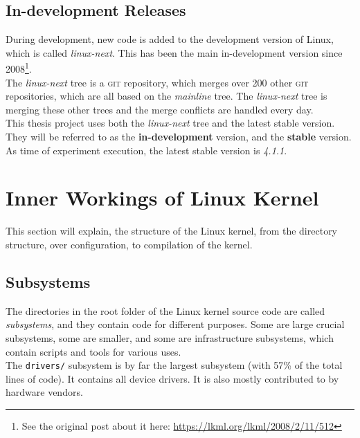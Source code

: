 \documentclass[a4paper,11pt]{report}
\newcommand{\f}{\footnote{\fn}}
\newcommand{\figa}{
    \begin{figure}[!htpb]
    \centering
}
\newcommand{\figb}[2]{
    \caption{#1}
    \label{#2}
    \end{figure}
}
\begin{document}
            \subsection*{In-development Releases}

            \def \fn {See the original post about it here: 
            \url{https://lkml.org/lkml/2008/2/11/512}}

During development, new code is added to the development version of Linux, 
which is called \emph{linux-next}. This has been the main in-development version
since 2008\f.
\\

The \emph{linux-next} tree is a \textsc{git} repository, which 
merges over 200 other \textsc{git} repositories\cite
    {nextTrees},
which are all based on the \emph{mainline} tree. The \emph{linux-next} tree is 
merging these other trees and the merge conflicts are handled every day.
\\

This thesis project uses both the \emph{linux-next} tree and the latest stable 
version. They will be referred to as the \textbf{in-development} 
version, and the \textbf{stable} version. As time of experiment execution, the 
latest stable version is \emph{4.1.1}.


    \section{Inner Workings of Linux Kernel}

This section will explain, the structure of the Linux kernel, from the 
directory structure, over configuration, to compilation of the kernel.


            \subsection{Subsystems}
            \label{sec:linuxss}

The directories in the root folder of the Linux kernel source code are called 
\emph{subsystems}, and they contain code for different purposes. Some are large 
crucial subsystems, some are smaller, and some are infrastructure 
subsystems, which contain scripts and tools for various uses\cite{42bugs}.
\\

The \texttt{drivers/} subsystem is by far the largest subsystem (with 57\% of 
the total lines of code). It contains all device drivers. It is also mostly 
contributed to by hardware vendors.
\\
\end{document}
